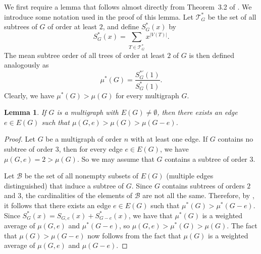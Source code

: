 \documentclass[12pt]{article}
\newtheorem{lemma}[theorem]{Lemma}
\theoremstyle{definition}
\begin{document}

We first require a lemma that follows almost directly from Theorem~3.2 of \cite{Andriantiana2019}. We introduce some notation used in the proof of this lemma. Let $\mathcal{T}_{G}^{*}$ be the set of all subtrees of $G$ of order at least $2$, and define $S_{G}^{*}(x)$ by 
\[
S_{G}^{*}(x)=\sum_{T\in\mathcal{T}_{G}^*}x^{|V(T)|}.
\]
 The mean subtree order of all trees of order at least $2$ of $G$ is then defined analogously as 
 \[
 \mu^{*}(G)=\frac{S_{G}^{*\prime}(1)}{S_{G}^{*}(1)}.
 \]
 Clearly, we have $\mu^*(G)>\mu(G)$ for every multigraph $G$.

\begin{lemma}\label{DecMeanEdgeDeletionLemma}
If $G$ is a multigraph  with $E(G)\neq\emptyset$, then there exists an edge $e\in E(G)$ such that $\mu(G,e)>\mu(G)>\mu(G-e)$.
\end{lemma}
\begin{proof}
Let $G$ be a multigraph of order $n$ with at least one edge.  If $G$ contains no subtree of order $3$, then for every edge $e\in E(G)$, we have $\mu(G,e)=2>\mu(G)$.  So we may assume that $G$ contains a subtree of order $3$.

Let $\mathcal{B}$ be the set of all nonempty subsets of $E(G)$ (multiple edges distinguished) that induce a subtree of $G$.  Since $G$ contains subtrees of orders $2$ and $3$, the cardinalities of the elements of $\mathcal{B}$ are not all the same.  Therefore, by \cite[Theorem 3.2]{Andriantiana2019}, it follows that there exists an edge $e\in E(G)$ such that $\mu^{*}(G)>\mu^{*}(G-e)$.  Since $S_G^{*}(x)=S_{G,e}(x)+S_{G-e}^{*}(x)$, we have that $\mu^{*}(G)$ is a weighted average of $\mu(G,e)$ and $\mu^{*}(G-e)$, so $\mu(G,e)>\mu^{*}(G)>\mu(G)$.  The fact that $\mu(G)>\mu(G-e)$ now follows from the fact that $\mu(G)$ is a weighted average of $\mu(G,e)$ and $\mu(G-e)$.
\end{proof}
\end{document}
